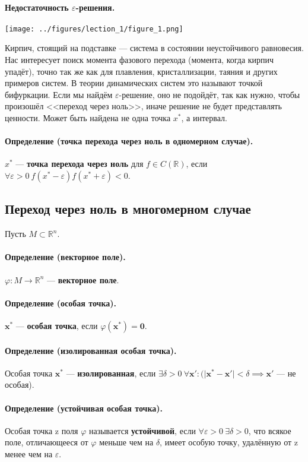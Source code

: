 \paragraph{Недостаточность $\varepsilon$-решения.}
\begin{center}
	\texttt{[image: ../figures/lection\_1/figure\_1.png]}
\end{center}
Кирпич, стоящий на подставке --- система в состоянии неустойчивого равновесия. Нас интересует поиск момента фазового перехода (момента, когда кирпич упадёт), точно так же как для плавления, кристаллизации, таяния и других примеров систем. В теории динамических систем это называют точкой бифуркации. Если мы найдём $\varepsilon$-решение, оно не подойдёт, так как нужно, чтобы произошёл <<переход через ноль>>, иначе решение не будет представлять ценности. Может быть найдена не одна точка $x^*$, а интервал.
\paragraph{Определение (точка перехода через ноль в одномерном случае).} $x^*$ --- \textbf{точка перехода через ноль} для $f\in C(\mathbb{R})$, если $\forall \varepsilon > 0 \  f(x^*-\varepsilon)f(x^*+\varepsilon) < 0$.
\subsection{Переход через ноль в многомерном случае}
Пусть $M \subset \mathbb{R}^n$.
\paragraph{Определение (векторное поле).} $\varphi:M\rightarrow\mathbb{R}^n$ --- \textbf{векторное поле}.
\paragraph{Определение (особая точка).} $\mathbf{x}^*$ --- \textbf{особая точка}, если $\varphi(\mathbf{x}^*)=\mathbf{0}$.
\paragraph{Определение (изолированная особая точка).} Особая точка $\mathbf{x}^*$ --- \textbf{изолированная}, если $\exists \delta > 0 \  \forall \mathbf{x'}: (\vert\mathbf{x}^*-\mathbf{x'}\vert<\delta \implies \mathbf{x'}$ --- не особая).
\paragraph{Определение (устойчивая особая точка).} Особая точка z поля $\varphi$ называется \textbf{устойчивой}, если $\forall \varepsilon > 0 \ \exists \delta > 0$, что всякое поле, отличающееся от $\varphi$ меньше чем на $\delta$, имеет особую точку, удалённую от z менее чем на $\varepsilon$.
\\


